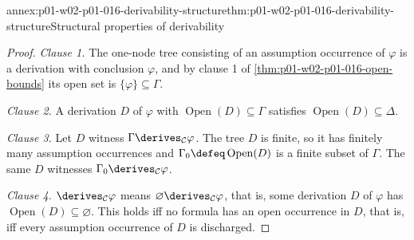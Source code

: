 \begin{annexitem}{annex:p01-w02-p01-016-derivability-structure}{thm:p01-w02-p01-016-derivability-structure}{Structural properties of derivability}
\begin{proof}
\emph{Clause 1.} The one-node tree consisting of an assumption occurrence
of \(\varphi\) is a derivation with conclusion \(\varphi\), and by clause 1
of \cref{thm:p01-w02-p01-016-open-bounds} its open set is
\(\{\varphi\}\subseteq\Gamma\).

\emph{Clause 2.} A derivation \(D\) of \(\varphi\) with
\(\operatorname{Open}(D)\subseteq\Gamma\) satisfies
\(\operatorname{Open}(D)\subseteq\Delta\).

\emph{Clause 3.} Let \(D\) witness \(\Gamma\derives_{\mathcal C}\varphi\). The
tree \(D\) is finite, so it has finitely many assumption occurrences and
\(\Gamma_0\defeq\operatorname{Open}(D)\) is a finite subset of \(\Gamma\).
The same \(D\) witnesses \(\Gamma_0\derives_{\mathcal C}\varphi\).

\emph{Clause 4.} \(\derives_{\mathcal C}\varphi\) means
\(\varnothing\derives_{\mathcal C}\varphi\), that is, some derivation \(D\)
of \(\varphi\) has \(\operatorname{Open}(D)\subseteq\varnothing\). This holds
iff no formula has an open occurrence in \(D\), that is, iff every assumption
occurrence of \(D\) is discharged.
\end{proof}
\end{annexitem}

